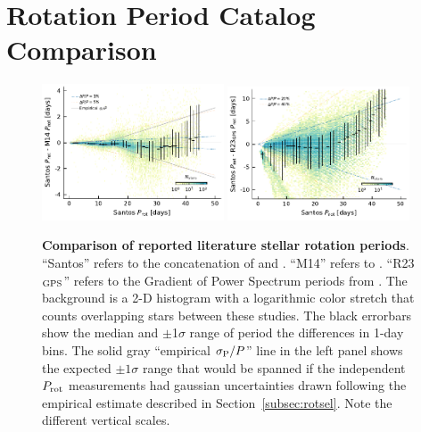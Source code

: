 \documentclass[11pt,twocolumn,tighten,linenumbers,trackchanges]{aastex63}
\begin{document}






\appendix

\section{Rotation Period Catalog Comparison}
\label{app:reinhold23}

\begin{figure}[!b]
  \begin{center}
    \leavevmode
      \includegraphics[width=0.48\textwidth]{perioddiff_vs_period_diffProt-m14_Prot_vs_Prot.pdf}
      \includegraphics[width=0.48\textwidth]{perioddiff_vs_period_diffProt-r23_ProtGPS_vs_Prot.pdf}
  \end{center}
  \vspace{-0.6cm}
  \caption{
    {\bf Comparison of reported literature stellar rotation periods}.
    ``Santos'' refers to the concatenation of \citet{Santos_2019} and
    \citet{Santos_2021}.  ``M14'' refers to \citet{McQuillan_2014}.
    ``R23$_{\rm GPS}$'' refers to the Gradient of Power Spectrum
    periods from \citet{Reinhold2023}.  The background is a 2-D
    histogram with a logarithmic color stretch that counts overlapping
    stars between these studies.  The black errorbars show the median
    and $\pm$1$\sigma$ range of period the differences in 1-day bins.
    The
    solid gray ``empirical $\sigma_{\rm P}/P$'' line in the left panel
    shows the expected $\pm 1\sigma$ range that would be spanned if
    the independent $P_{\rm rot}$ measurements had gaussian
    uncertainties drawn following the empirical estimate described in
    Section~\ref{subsec:rotsel}.
    Note the different vertical scales.
    \label{fig:perioddiff}
  }
\end{figure}
\end{document}
